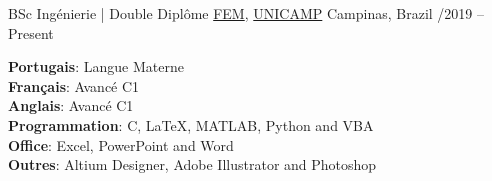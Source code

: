 \documentclass[8pt, a4paper]{article}
\begin{document}
\headedsection
    {BSc Ingénierie | Double Diplôme}
    {\textsc{}}
    {
        \headedsubsection
        {\href{https://www.fem.unicamp.br/index.php/pt-br/}{FEM}, \href{https://www.unicamp.br/unicamp/universidade}{UNICAMP}}
        {Campinas, Brazil /2019 -- Present}
        {}
    }


\vspace{6mm}
\begin{multicols}{2}
    \vspace{2mm}
    \textbf{Portugais}: Langue Materne\\
    \textbf{Français}: Avancé C1\\
    \textbf{Anglais}: Avancé C1\\
    \columnbreak
    \vspace{2mm}
    \textbf{Programmation}: C, LaTeX, MATLAB, Python and VBA\\
    \textbf{Office}: Excel, PowerPoint and Word\\
    \textbf{Outres}: Altium Designer, Adobe Illustrator and Photoshop\\
\end{multicols}
\end{document}
